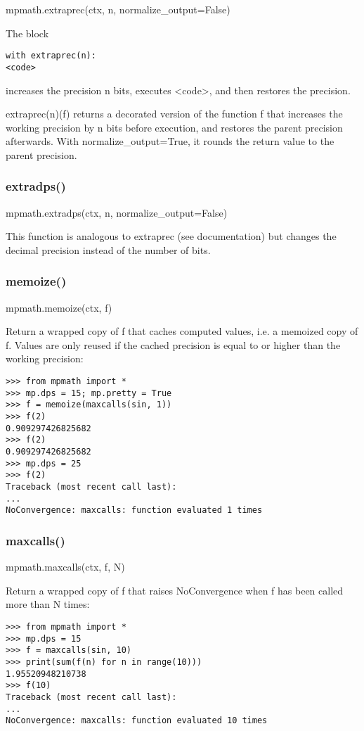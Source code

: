 mpmath.extraprec(ctx, n, normalize\_output=False)

The block
\begin{lstlisting}
with extraprec(n):
<code>
\end{lstlisting}
increases the precision n bits, executes <code>, and then restores the precision.

\vpara
extraprec(n)(f) returns a decorated version of the function f that increases the working precision by n bits before execution, and restores the parent precision afterwards. With normalize\_output=True, it rounds the return value to the parent precision.

\subsubsection{extradps()}

mpmath.extradps(ctx, n, normalize\_output=False)

This function is analogous to extraprec (see documentation) but changes the decimal precision instead of the number of bits.


\subsubsection{memoize()}

mpmath.memoize(ctx, f)

\vpara
Return a wrapped copy of f that caches computed values, i.e. a memoized copy of f. Values are only reused if the cached precision is equal to or higher than the working precision:

\begin{lstlisting}
>>> from mpmath import *
>>> mp.dps = 15; mp.pretty = True
>>> f = memoize(maxcalls(sin, 1))
>>> f(2)
0.909297426825682
>>> f(2)
0.909297426825682
>>> mp.dps = 25
>>> f(2)
Traceback (most recent call last):
...
NoConvergence: maxcalls: function evaluated 1 times
\end{lstlisting}


\subsubsection{maxcalls()}

mpmath.maxcalls(ctx, f, N)

\vpara
Return a wrapped copy of f that raises NoConvergence when f has been called more than N times:

\begin{lstlisting}
>>> from mpmath import *
>>> mp.dps = 15
>>> f = maxcalls(sin, 10)
>>> print(sum(f(n) for n in range(10)))
1.95520948210738
>>> f(10)
Traceback (most recent call last):
...
NoConvergence: maxcalls: function evaluated 10 times
\end{lstlisting}


